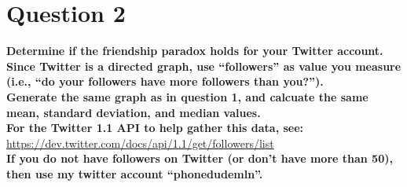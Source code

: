 \chapter{Question 2}
\label{avoiding-uri-aliases} 

\textbf {Determine if the friendship paradox holds for your Twitter account. Since Twitter is a directed graph, use ``followers'' as value you measure
(i.e., ``do your followers have more followers than you?'').\\
Generate the same graph as in question 1, and calcuate the same  mean, standard deviation, and median values.\\
For the Twitter 1.1 API to help gather this data, see:}\\
{\url{https://dev.twitter.com/docs/api/1.1/get/followers/list}}\\
\textbf{If you do not have followers on Twitter (or don't have more than 50), then use my twitter account ``phonedude\textunderscore mln''.}


